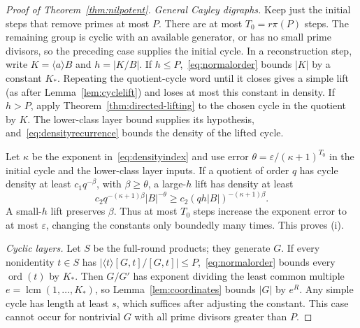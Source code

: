 \documentclass[11pt,a4paper,reqno]{amsart}
\theoremstyle{definition}
\theoremstyle{remark}
\numberwithin{equation}{section}
\DeclareMathOperator{\ord}{ord}
\DeclareMathOperator{\lcm}{lcm}
\newcommand{\gen}[1]{\langle #1\rangle}
\newcommand{\eps}{\varepsilon}
\begin{document}
\begin{proof}[Proof of Theorem~\ref{thm:nilpotent}]
\emph{General Cayley digraphs.}
Keep just the initial steps that remove primes at most $P$. There are at most $T_0=r\pi(P)$ steps. The remaining group is cyclic with an available generator, or has no small prime divisors, so the preceding case supplies the initial cycle. In a reconstruction step, write $K=\gen aB$ and $h=|K/B|$. If $h\le P$,~\eqref{eq:normalorder} bounds $|K|$ by a constant $K_*$. Repeating the quotient-cycle word until it closes gives a simple lift (as after Lemma~\ref{lem:cyclelift}) and loses at most this constant in density. If $h>P$, apply Theorem~\ref{thm:directed-lifting} to the chosen cycle in the quotient by $K$. The lower-class layer bound supplies its hypothesis, and~\eqref{eq:densityrecurrence} bounds the density of the lifted cycle.

Let $\kappa$ be the exponent in~\eqref{eq:densityindex} and use error $\theta=\eps/(\kappa+1)^{T_0}$ in the initial cycle and the lower-class layer inputs. If a quotient of order $q$ has cycle density at least $c_1q^{-\beta}$, with $\beta\ge\theta$, a large-$h$ lift has density at least
\[
 c_2q^{-(\kappa+1)\beta}|B|^{-\theta}
 \ge c_2(qh|B|)^{-(\kappa+1)\beta}.
\]
A small-$h$ lift preserves $\beta$. Thus at most $T_0$ steps increase the exponent error to at most $\eps$, changing the constants only boundedly many times. This proves (i).

\emph{Cyclic layers.}
Let $S$ be the full-round products; they generate $G$. If every nonidentity $t\in S$ has $|\gen t[G,t]/[G,t]|\le P$,~\eqref{eq:normalorder} bounds every $\ord(t)$ by $K_*$. Then $G/G'$ has exponent dividing the least common multiple $e=\lcm(1,\ldots,K_*)$, so Lemma~\ref{lem:coordinates} bounds $|G|$ by $e^R$. Any simple cycle has length at least $s$, which suffices after adjusting the constant. This case cannot occur for nontrivial $G$ with all prime divisors greater than $P$.


\end{proof}
\end{document}
